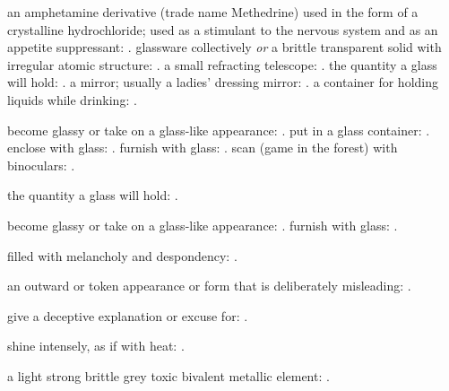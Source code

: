   an amphetamine derivative (trade name Methedrine) used in the form of a crystalline hydrochloride; used as a stimulant to the nervous system and as an appetite suppressant: . glassware collectively \textit{or} a brittle transparent solid with irregular atomic structure: . a small refracting telescope: . the quantity a glass will hold: . a mirror; usually a ladies' dressing mirror: . a container for holding liquids while drinking: .

  become glassy or take on a glass-like appearance: . put in a glass container: . enclose with glass: . furnish with glass: . scan (game in the forest) with binoculars: .

  the quantity a glass will hold: .

  become glassy or take on a glass-like appearance: . furnish with glass: .

  filled with melancholy and despondency: .

  an outward or token appearance or form that is deliberately misleading: .

  give a deceptive explanation or excuse for: .

  shine intensely, as if with heat: .

  a light strong brittle grey toxic bivalent metallic element: .

